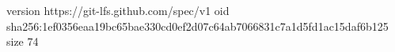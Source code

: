 version https://git-lfs.github.com/spec/v1
oid sha256:1ef0356eaa19bc65bae330cd0ef2d07c64ab7066831c7a1d5fd1ac15daf6b125
size 74
